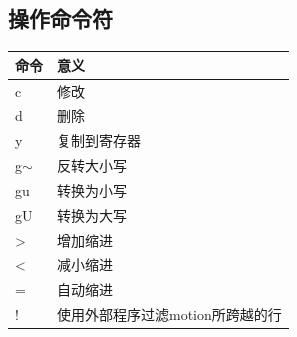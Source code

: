 \subsection{操作命令符}
\begin{longtable}{ll}\hline\hline

	\textbf{命令} & \textbf{意义}\\

    \endhead

    c & 修改 \\

    d & 删除\\

    y & 复制到寄存器 \\
    
    g$\sim$ & 反转大小写\\

    gu & 转换为小写\\
	
    gU & 转换为大写\\
	
    > & 增加缩进\\

    < & 减小缩进\\

    = & 自动缩进\\

	! & 使用外部程序过滤{motion}所跨越的行\\
    \hline
\end{longtable} 
 
